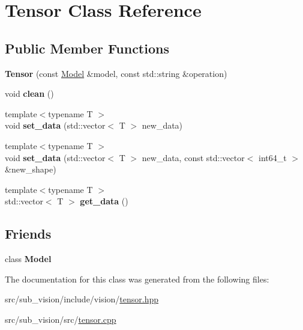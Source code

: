 \hypertarget{classTensor}{}\section{Tensor Class Reference}
\label{classTensor}
\subsection*{Public Member Functions}
\begin{DoxyCompactItemize}
\item 
\mbox{\label{classTensor_a6c3485c4cba54b46d089a5f7ff7343e4}} 
{\bfseries Tensor} (const \hyperlink{classModel}{Model} \&model, const std\+::string \&operation)
\item 
\mbox{\label{classTensor_a6ec8a2a453925c4c7c4b4f2e00e39969}} 
void {\bfseries clean} ()
\item 
\mbox{\label{classTensor_a88bad5d26a577b8c9fc17d9ed596b6de}} 
{\footnotesize template$<$typename T $>$ }\\void {\bfseries set\+\_\+data} (std\+::vector$<$ T $>$ new\+\_\+data)
\item 
\mbox{\label{classTensor_add3a04022143bd47e241cd43625701bb}} 
{\footnotesize template$<$typename T $>$ }\\void {\bfseries set\+\_\+data} (std\+::vector$<$ T $>$ new\+\_\+data, const std\+::vector$<$ int64\+\_\+t $>$ \&new\+\_\+shape)
\item 
\mbox{\label{classTensor_ab9c3963f3abe22265816ac0ba5663fd1}} 
{\footnotesize template$<$typename T $>$ }\\std\+::vector$<$ T $>$ {\bfseries get\+\_\+data} ()
\end{DoxyCompactItemize}
\subsection*{Friends}
\begin{DoxyCompactItemize}
\item 
\mbox{\label{classTensor_a2bf2a0e9b454c55aa5dcb5aa4698697b}} 
class {\bfseries Model}
\end{DoxyCompactItemize}


The documentation for this class was generated from the following files\+:\begin{DoxyCompactItemize}
\item 
src/sub\+\_\+vision/include/vision/\hyperlink{tensor_8hpp}{tensor.\+hpp}\item 
src/sub\+\_\+vision/src/\hyperlink{tensor_8cpp}{tensor.\+cpp}\end{DoxyCompactItemize}
